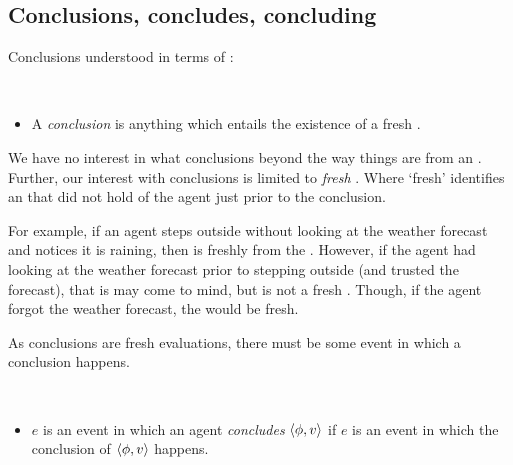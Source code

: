 \subsection{Conclusions, concludes, concluding}
\label{sec:concl-events-which}

\begin{note}
  Conclusions understood in terms of :

  \begin{definition}[Conclusions]
    \label{assu:concluding:pvp}
    \mbox{ }
    \vspace{-\baselineskip}
    \begin{itemize}
    \item
      A \emph{conclusion} is anything which entails the existence of a fresh \evalN{}.
    \end{itemize}
    \vspace{-\baselineskip}
  \end{definition}

  \noindent%
  We have no interest in what conclusions beyond \evals{} the way things are from an \agpe{}.
  Further, our interest with conclusions is limited to \emph{fresh} \evals{}.
  Where `fresh' identifies an \eval{} that did not hold of the agent just prior to the conclusion.

  For example, if an agent steps outside without looking at the weather forecast and notices it is raining, then  is freshly \evaled{}  from the \agpe{}.
  However, if the agent had looking at the weather forecast prior to stepping outside (and trusted the forecast), that  is \evaled{}  may come to mind, but is not a fresh \evalN{}.
  Though, if the agent forgot the weather forecast, the \evalN{} would be fresh.
\end{note}

\begin{note}
  As conclusions are fresh evaluations, there must be some event in which a conclusion happens.

  \begin{definition}
    \label{def:conclusionE}
    \mbox{ }
    \vspace{-\baselineskip}
    \begin{itemize}
    \item
      \(e\) is an event in which an agent \emph{concludes} \(\langle \phi, v \rangle\) if \(e\) is an event in which the conclusion of \(\langle \phi, v \rangle\) happens.
    \end{itemize}
    \vspace{-\baselineskip}
  \end{definition}
\end{note}

